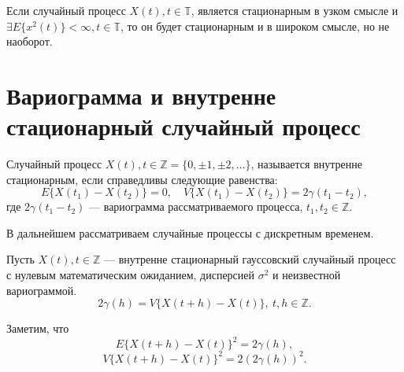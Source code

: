 \begin{Remark}
	Если случайный процесс $ X(t), t \in \mathbb{T} $, является стационарным в узком смысле и $ \exists E \{ x^2(t) \} < \infty, t \in \mathbb{T} $, то он будет стационарным и в широком смысле, но не наоборот.
\end{Remark}

\section{Вариограмма и внутренне стационарный случайный процесс}
\label{sec:variogramAndInnerStationarity}



Случайный процесс $ X(t), t \in \mathbb{Z} = \{0, \pm 1, \pm 2, \dots \} $, называется внутренне стационарным, если справедливы следующие равенства:
\begin{equation*}
	E \{ X(t_1) - X(t_2) \} = 0, \quad V \{ X(t_1) - X(t_2) \} = 2 \gamma(t_1 - t_2),
\end{equation*}
где $ 2 \gamma(t_1 - t_2) $ --- вариограмма рассматриваемого процесса, $ t_1, t_2 \in \mathbb{Z} $.


В дальнейшем рассматриваем случайные процессы с дискретным временем.

Пусть $ X(t), t \in \mathbb{Z} $ --- внутренне стационарный гауссовский случайный процесс с нулевым математическим ожиданием, дисперсией $ \sigma^2 $ и неизвестной вариограммой.
\begin{equation*}
	2 \gamma(h) = V \{ X(t + h) - X(t) \}, ~ t,h \in \mathbb{Z}.
\end{equation*}

Заметим, что
\begin{equation}
\label{eq:E_diff_inc}
	E \{ X(t + h) - X(t) \}^2 = 2 \gamma(h),
\end{equation}
\begin{equation}
\label{eq:V_diff_inc}
	V \{ X(t + h) - X(t) \}^2 = 2 (2 \gamma(h))^2.
\end{equation}
